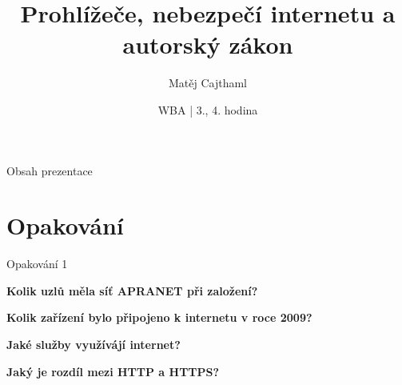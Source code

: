 \documentclass[aspectratio=169]{beamer}
\title{Prohlížeče, nebezpečí internetu a autorský zákon}
\date{WBA | 3., 4. hodina}
\author[Cajthaml]{Matěj Cajthaml}
\begin{document}
\begin{frame}
\titlepage
\end{frame}

\begin{frame}{Obsah prezentace}
    \begin{cardTiny}
        \begin{minipage}{\textwidth}
            \vspace{1ex}
            \tableofcontents
        \end{minipage}
    \end{cardTiny}
\end{frame}



\section{Opakování}

\begin{frame}{Opakování 1}
    \begin{cardTiny}
        \begin{center}
            \textbf{Kolik uzlů měla síť APRANET při založení?}
        \end{center}
    \end{cardTiny}
    \begin{cardTiny}
        \begin{center}
            \textbf{Kolik zařízení bylo připojeno k internetu v roce 2009?}
        \end{center}
    \end{cardTiny}
       
    \begin{cardTiny}
        \begin{center}
            \textbf{Jaké služby využívájí internet?}
        \end{center}
    \end{cardTiny} 
    \begin{cardTiny}
        \begin{center}
            \textbf{Jaký je rozdíl mezi HTTP a HTTPS?}
        \end{center}
    \end{cardTiny}
\end{frame}
\end{document}

